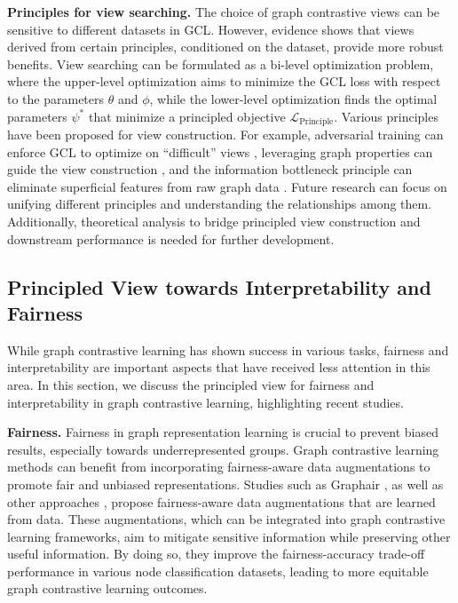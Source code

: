 \documentclass[11pt]{article}
\begin{document}
\textbf{Principles for view searching.}
The choice of graph contrastive views can be sensitive to different datasets in GCL. However, evidence shows that views derived from certain principles, conditioned on the dataset, provide more robust benefits. View searching can be formulated as a bi-level optimization problem, where the upper-level optimization aims to minimize the GCL loss with respect to the parameters $\theta$ and $\phi$, while the lower-level optimization finds the optimal parameters $\psi^*$ that minimize a principled objective $\mathcal{L}_\mathrm{Principle}$. Various principles have been proposed for view construction. For example, adversarial training can enforce GCL to optimize on ``difficult'' views \cite{you2021graph}, leveraging graph properties can guide the view construction \cite{zhu2021graph}, and the information bottleneck principle can eliminate superficial features from raw graph data \cite{you2022bringing, suresh2021adversarial, xu2021infogcl}. Future research can focus on unifying different principles and understanding the relationships among them. Additionally, theoretical analysis to bridge principled view construction and downstream performance is needed for further development.

\subsection{Principled View towards Interpretability and Fairness}
While graph contrastive learning has shown success in various tasks, fairness and interpretability are important aspects that have received less attention in this area. In this section, we discuss the principled view for fairness and interpretability in graph contrastive learning, highlighting recent studies.

\textbf{Fairness.} Fairness in graph representation learning is crucial to prevent biased results, especially towards underrepresented groups. Graph contrastive learning methods can benefit from incorporating fairness-aware data augmentations to promote fair and unbiased representations. Studies such as Graphair \cite{ling2023learning}, as well as other approaches \cite{kose2022fair, kose2022fair2}, propose fairness-aware data augmentations that are learned from data. These augmentations, which can be integrated into graph contrastive learning frameworks, aim to mitigate sensitive information while preserving other useful information. By doing so, they improve the fairness-accuracy trade-off performance in various node classification datasets, leading to more equitable graph contrastive learning outcomes.
\end{document}

